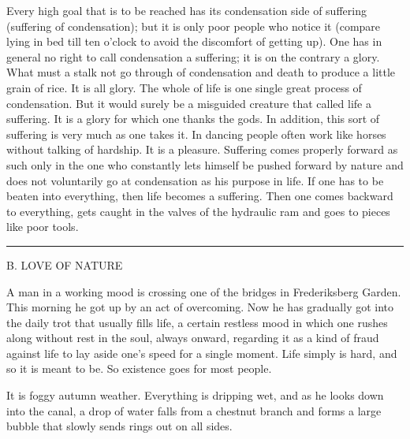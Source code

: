 \documentclass[12pt,a4paper,openany]{book}
\newcommand{\opage}[1]{\marginnote{\footnotesize\textit{[#1]}}}
\newcommand{\excerpthead}[1]{\par\bigskip\begin{center}#1\end{center}\nopagebreak\smallskip}
\newcommand{\sectionrule}{\par\begin{center}\rule{4em}{0.4pt}\end{center}}
\begin{document}
Every high goal that is to be reached has its condensation side
of suffering (suffering of condensation); but it is only poor people
who notice it (compare lying in bed till ten o'clock
to avoid the discomfort of getting up). One has in general
no right to call condensation a suffering; it is on the contrary
a glory. What must a stalk not go through
\setcounter{footnote}{0}%
\opage{295}of condensation and death to produce a little grain of rice. It
is all glory. The whole of life is one single great process of condensation.
But it would surely be a misguided creature
that called life a suffering. It is a glory for which
one thanks the gods. In addition, this sort of suffering
is very much as one takes it. In dancing people often work like
horses without talking of hardship. It is a pleasure.
Suffering comes properly forward as such only in
the one who constantly lets himself be pushed forward by nature and does not
voluntarily go at condensation as his purpose in life. If
one has to be beaten into everything, then life becomes a suffering. Then one comes
backward to everything, gets caught in the valves of the hydraulic ram
and goes to pieces like poor tools.

\sectionrule

\excerpthead{B. LOVE OF NATURE}


A man in a working mood is crossing one of the bridges in Frederiksberg
Garden. This morning he got up by an act of overcoming. Now
he has gradually got into the daily trot that usually
fills life, a certain restless mood in which one rushes along
without rest in the soul, always onward, regarding it as
a kind of fraud against life to lay aside one's speed for
a single moment. Life simply is hard, and so it is meant to be. So
existence goes for most people.

It is foggy autumn weather. Everything is dripping wet, and
as he looks down into the canal, a drop of water falls from a
chestnut branch and forms a large bubble that slowly sends
rings out on all sides.
\end{document}
